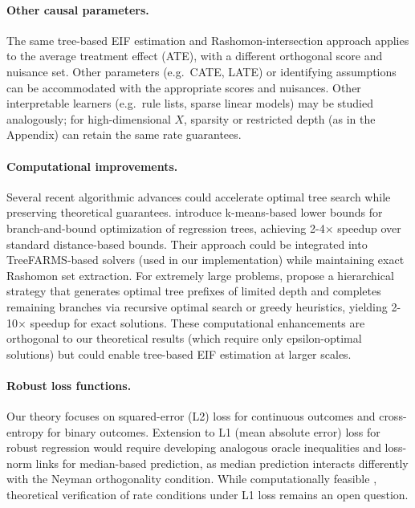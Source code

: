 \documentclass[12pt]{article}
\begin{document}
\paragraph{Other causal parameters.}
The same tree-based EIF estimation and Rashomon-intersection approach applies to the average treatment effect (ATE), with a different orthogonal score and nuisance set. Other parameters (e.g.\ CATE, LATE) or identifying assumptions can be accommodated with the appropriate scores and nuisances. Other interpretable learners (e.g.\ rule lists, sparse linear models) may be studied analogously; for high-dimensional $X$, sparsity or restricted depth (as in the Appendix) can retain the same rate guarantees.

\paragraph{Computational improvements.}
Several recent algorithmic advances could accelerate optimal tree search while preserving theoretical guarantees. \citet{zhangOptimalSparseRegression2023} introduce k-means-based lower bounds for branch-and-bound optimization of regression trees, achieving 2-4$\times$ speedup over standard distance-based bounds. Their approach could be integrated into TreeFARMS-based solvers (used in our implementation) while maintaining exact Rashomon set extraction. For extremely large problems, \citet{babbarNearOptimalDecisionTrees2025} propose a hierarchical strategy that generates optimal tree prefixes of limited depth and completes remaining branches via recursive optimal search or greedy heuristics, yielding 2-10$\times$ speedup for exact solutions. These computational enhancements are orthogonal to our theoretical results (which require only epsilon-optimal solutions) but could enable tree-based EIF estimation at larger scales.

\paragraph{Robust loss functions.}
Our theory focuses on squared-error (L2) loss for continuous outcomes and cross-entropy for binary outcomes. Extension to L1 (mean absolute error) loss for robust regression would require developing analogous oracle inequalities and loss-norm links for median-based prediction, as median prediction interacts differently with the Neyman orthogonality condition. While computationally feasible \citep{zhangOptimalSparseRegression2023}, theoretical verification of rate conditions under L1 loss remains an open question.
\end{document}
